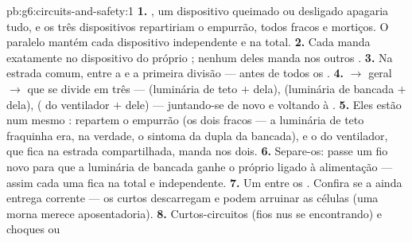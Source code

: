 \begin{solution}{pb:g6:circuits-and-safety:1}
\textbf{1.} , um dispositivo queimado ou desligado apagaria
tudo, e os três dispositivos repartiriam o empurrão, todos fracos e
mortiços. O paralelo mantém cada dispositivo independente e na 
total.
\textbf{2.} Cada  manda exatamente no dispositivo do
próprio ; nenhum deles manda nos outros .
\textbf{3.} Na estrada comum, entre a  e a primeira divisão ---
antes de todos os .
\textbf{4.}  $\to$  geral $\to$  que se divide em
três  --- (luminária de teto $+$  dela), (luminária
de bancada $+$  dela), ( do ventilador $+$
 dele) --- juntando-se de novo e voltando à .
\textbf{5.} Eles estão  num mesmo : repartem o empurrão
(os dois fracos --- a luminária de teto fraquinha era, na verdade, o
sintoma da dupla da bancada), e o  do ventilador, que fica
na estrada compartilhada, manda nos dois.
\textbf{6.} Separe-os: passe um fio novo para que a luminária de
bancada ganhe o próprio  ligado à alimentação --- assim cada uma
fica na  total e independente.
\textbf{7.} Um  entre os . Confira se a 
ainda entrega corrente --- os curtos descarregam e podem arruinar as
células (uma  morna merece aposentadoria).
\textbf{8.} Curtos-circuitos (fios nus se encontrando) e choques ou

\end{solution}

